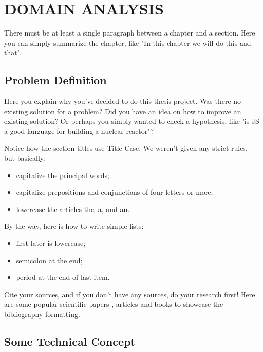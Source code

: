 \chapter{DOMAIN ANALYSIS}

There must be at least a single paragraph between a chapter and a section.
Here you can simply summarize the chapter, like "In this chapter we will do this and that".

\section{Problem Definition}

Here you explain why you've decided to do this thesis project.
Was there no existing solution for a problem?
Did you have an idea on how to improve an existing solution?
Or perhaps you simply wanted to check a hypothesis,
like "is JS a good language for building a nuclear reactor"?

Notice how the section titles use Title Case.
We weren't given any strict rules, but basically:
\begin{itemize}
\item capitalize the principal words;
\item capitalize prepositions and conjunctions of four letters or more;
\item lowercase the articles the, a, and an.
\end{itemize}

By the way, here is how to write simple lists:
\begin{itemize}
    \item first later is lowercase;
    \item semicolon at the end;
    \item period at the end of last item.
\end{itemize}

Cite your sources, and if you don't have any sources, do your research first!
Here are some popular scientific papers \cite{Sarkar2020OAuth, mcculloch1943logical,shannon1948mathematical,rumelhart1986learning,vaswani2017attention},
articles \cite{he2016deep,brooks1987no,turing1950computing,dijkstra1968go,cerf1974protocol}
and books \cite{knuth1974structured,knuth1997art,cormen2009introduction,aima2020,sipser2012introduction,tanenbaum2006structured}
to showcase the bibliography formatting.

\section{Some Technical Concept}

